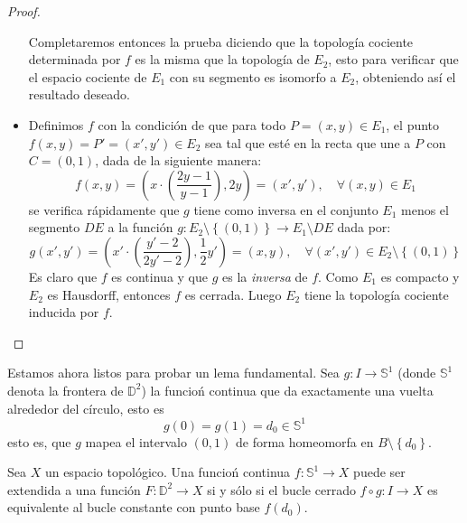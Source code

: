 \documentclass{article}
\newcounter{it}
\theoremstyle{largebreak}
\newcommand\cf[3]{\ensuremath{#1:#2\rightarrow#3}}
\begin{document}
\begin{proof}
\begin{itemize}
            Completaremos entonces la prueba diciendo que la topología cociente determinada por $f$ es la misma que la topología de $E_2$, esto para verificar que el espacio cociente de $E_1$ con su segmento es isomorfo a $E_2$, obteniendo así el resultado deseado.
            \item Definimos $f$ con la condición de que para todo $P=(x,y)\in E_1$, el punto $f(x,y)=P'=(x',y')\in E_2$ sea tal que esté en la recta que une a $P$ con $C=(0,1)$, dada de la siguiente manera:
            \begin{equation*}
                f(x,y)=\left(x\cdot\left(\frac{2y-1}{y-1}\right),2y \right)=(x',y'),\quad\forall (x,y)\in E_1
            \end{equation*}
            se verifica rápidamente que $g$ tiene como inversa en el conjunto $E_1$ menos el segmento $DE$ a la función $\cf{g}{E_2\setminus\left\{(0,1)\right\} }{E_1\setminus DE}$ dada por:
            \begin{equation*}
                g(x',y')=\left(x'\cdot\left(\frac{y'-2}{2y'-2} \right), \frac{1}{2}y'\right)=(x,y),\quad\forall (x',y')\in E_2\setminus\left\{(0,1) \right\} 
            \end{equation*}
            Es claro que $f$ es continua y que $g$ es la \textit{inversa} de $f$. Como $E_1$ es compacto y $E_2$ es Hausdorff, entonces $f$ es cerrada. Luego $E_2$ tiene la topología cociente inducida por $f$.
        \end{itemize}
    \end{proof}

    Estamos ahora listos para probar un lema fundamental. Sea $\cf{g}{I}{\mathbb{S}^1}$ (donde $\mathbb{S}^1$ denota la frontera de $\mathbb{D}^2$) la funcioń continua que da exactamente una vuelta alrededor del círculo, esto es
    \begin{equation*}
        g(0)=g(1)=d_0\in\mathbb{S}^1
    \end{equation*}
    esto es, que $g$ mapea el intervalo $(0,1)$ de forma homeomorfa en $B\setminus\left\{d_0 \right\}$.

    \begin{lema}
        Sea $X$ un espacio topológico. Una funcioń continua $\cf{f}{\mathbb{S}^1}{X}$ puede ser extendida a una función $\cf{F}{\mathbb{D}^2}{X}$ si y sólo si el bucle cerrado $\cf{f\circ g}{I}{X}$ es equivalente al bucle constante con punto base $f(d_0)$.
    \end{lema}
\end{document}
